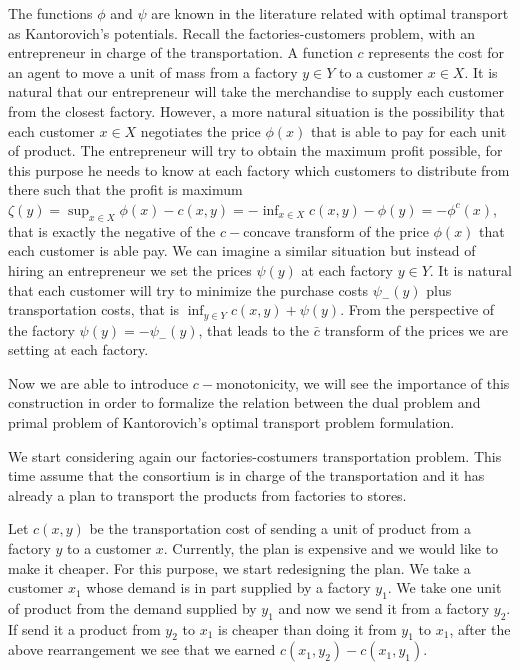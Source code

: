 The functions $\phi$ and $\psi$ are known in the literature related with optimal transport as Kantorovich's potentials. Recall the factories-customers problem, with an entrepreneur in charge of the transportation. A function $c$ represents the cost for an agent to move a unit of mass from a factory $y\in Y$ to a customer $x\in X$. It is natural that our entrepreneur will take the merchandise to supply each customer from the closest factory. However, a more natural situation is the possibility that each customer $x\in X$ negotiates the price $\phi(x)$ that is able to pay for each unit of product. The entrepreneur will try to obtain the maximum profit possible, for this purpose he needs to know at each factory which customers to distribute from there such that the profit is maximum $\zeta(y)=\sup_{x\in X}\phi(x)-c(x,y)=-\inf_{x\in X} c(x,y)-\phi(y)=-\phi^c(x)$, that is exactly the negative of the $c-$concave transform of the price $\phi(x)$ that each customer is able pay. We can imagine a similar situation but instead of hiring an entrepreneur we set the prices $\psi(y)$ at each factory $y\in Y$. It is natural that each customer will try to minimize the purchase costs $\psi_{-}(y)$ plus transportation costs, that is $\inf_{y\in Y}c(x,y)+\psi(y)$. From the perspective of the factory $\psi(y)=-\psi_{-}(y)$, that leads to the $\bar{c}$ transform of the prices we are setting at each factory. 

Now we are able to introduce $c-$monotonicity, we will see the importance of this construction in order to formalize the relation between the dual problem and primal problem of Kantorovich's optimal transport problem formulation. 

We start considering again our factories-costumers transportation problem. This time assume that the consortium is in charge of the transportation and it has already a plan to transport the products from factories to stores. 

Let $c(x,y)$ be the transportation cost of sending a unit of product from a factory $y$ to a customer $x$. Currently, the plan is expensive and we would like to make it cheaper.  For this purpose, we start redesigning the plan. We take a customer $x_1$ whose demand is in part supplied by a factory $y_1$. We take one unit of product from the demand supplied by $y_1$ and now we send it from a factory $y_2$. If send it a product from $y_2$ to $x_1$ is cheaper than doing it from $y_1$ to $x_1$, after the above rearrangement we see that we earned $c(x_1, y_2)-c(x_1,y_1)$. 

